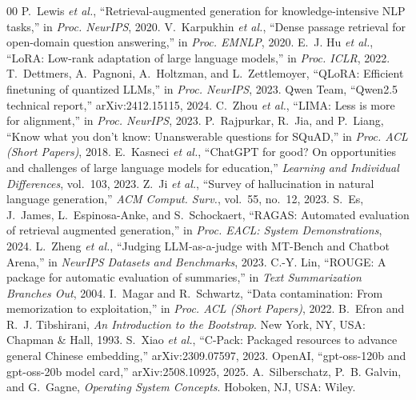 \documentclass[conference]{IEEEtran}
\begin{document}
\begin{thebibliography}{00}
 P.~Lewis \emph{et al.}, ``Retrieval-augmented generation for knowledge-intensive NLP tasks,'' in \emph{Proc. NeurIPS}, 2020.
 V.~Karpukhin \emph{et al.}, ``Dense passage retrieval for open-domain question answering,'' in \emph{Proc. EMNLP}, 2020.
 E.~J. Hu \emph{et al.}, ``LoRA: Low-rank adaptation of large language models,'' in \emph{Proc. ICLR}, 2022.
 T.~Dettmers, A.~Pagnoni, A.~Holtzman, and L.~Zettlemoyer, ``QLoRA: Efficient finetuning of quantized LLMs,'' in \emph{Proc. NeurIPS}, 2023.
 Qwen Team, ``Qwen2.5 technical report,'' arXiv:2412.15115, 2024.
 C.~Zhou \emph{et al.}, ``LIMA: Less is more for alignment,'' in \emph{Proc. NeurIPS}, 2023.
 P.~Rajpurkar, R.~Jia, and P.~Liang, ``Know what you don't know: Unanswerable questions for SQuAD,'' in \emph{Proc. ACL (Short Papers)}, 2018.
 E.~Kasneci \emph{et al.}, ``ChatGPT for good? On opportunities and challenges of large language models for education,'' \emph{Learning and Individual Differences}, vol.~103, 2023.
 Z.~Ji \emph{et al.}, ``Survey of hallucination in natural language generation,'' \emph{ACM Comput. Surv.}, vol.~55, no.~12, 2023.
 S.~Es, J.~James, L.~Espinosa-Anke, and S.~Schockaert, ``RAGAS: Automated evaluation of retrieval augmented generation,'' in \emph{Proc. EACL: System Demonstrations}, 2024.
 L.~Zheng \emph{et al.}, ``Judging LLM-as-a-judge with MT-Bench and Chatbot Arena,'' in \emph{NeurIPS Datasets and Benchmarks}, 2023.
 C.-Y. Lin, ``ROUGE: A package for automatic evaluation of summaries,'' in \emph{Text Summarization Branches Out}, 2004.
 I.~Magar and R.~Schwartz, ``Data contamination: From memorization to exploitation,'' in \emph{Proc. ACL (Short Papers)}, 2022.
 B.~Efron and R.~J. Tibshirani, \emph{An Introduction to the Bootstrap}. New York, NY, USA: Chapman \& Hall, 1993.
 S.~Xiao \emph{et al.}, ``C-Pack: Packaged resources to advance general Chinese embedding,'' arXiv:2309.07597, 2023.
 OpenAI, ``gpt-oss-120b and gpt-oss-20b model card,'' arXiv:2508.10925, 2025.
 A.~Silberschatz, P.~B. Galvin, and G.~Gagne, \emph{Operating System Concepts}. Hoboken, NJ, USA: Wiley.
\end{thebibliography}
\end{document}

